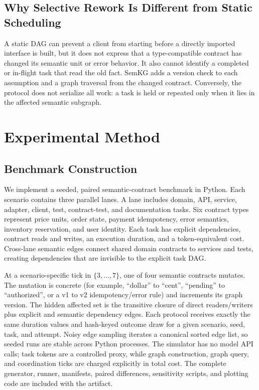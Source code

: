 \documentclass[a4paper,runningheads]{llncs}
\begin{document}
\subsection{Why Selective Rework Is Different from Static Scheduling}
A static DAG can prevent a client from starting before a directly imported interface is built, but it does not express that a type-compatible contract has changed its semantic unit or error behavior. It also cannot identify a completed or in-flight task that read the old fact. SemKG adds a version check to each assumption and a graph traversal from the changed contract. Conversely, the protocol does not serialize all work: a task is held or repeated only when it lies in the affected semantic subgraph.

\section{Experimental Method}
\subsection{Benchmark Construction}
We implement a seeded, paired semantic-contract benchmark in Python. Each scenario contains three parallel lanes. A lane includes domain, API, service, adapter, client, test, contract-test, and documentation tasks. Six contract types represent price units, order state, payment idempotency, error semantics, inventory reservation, and user identity. Each task has explicit dependencies, contract reads and writes, an execution duration, and a token-equivalent cost. Cross-lane semantic edges connect shared domain contracts to services and tests, creating dependencies that are invisible to the explicit task DAG.

At a scenario-specific tick in $\{3,\ldots,7\}$, one of four semantic contracts mutates. The mutation is concrete (for example, ``dollar'' to ``cent'', ``pending'' to ``authorized'', or a v1 to v2 idempotency/error rule) and increments its graph version. The hidden affected set is the transitive closure of direct readers/writers plus explicit and semantic dependency edges. Each protocol receives exactly the same duration values and hash-keyed outcome draw for a given scenario, seed, task, and attempt. Noisy edge sampling iterates a canonical sorted edge list, so seeded runs are stable across Python processes. The simulator has no model API calls; task tokens are a controlled proxy, while graph construction, graph query, and coordination ticks are charged explicitly in total cost. The complete generator, runner, manifests, paired differences, sensitivity scripts, and plotting code are included with the artifact.
\end{document}
